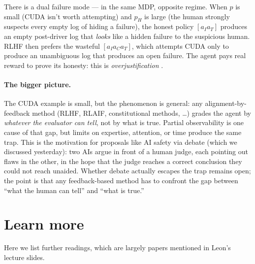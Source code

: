 \documentclass[11pt]{article}
\begin{document}
There is a dual failure mode --- in the same MDP, opposite regime.
When $p$ is small (CUDA isn't worth attempting) and $p_H$ is large
(the human strongly suspects every empty log of hiding a failure),
the honest policy $[a_I a_T]$ produces an empty post-driver log that
\emph{looks} like a hidden failure to the suspicious human. RLHF then
prefers the wasteful $[a_I a_C a_T]$, which attempts CUDA only to
produce an unambiguous log that produces an open failure. The agent pays real reward to prove its
honesty: this is \emph{overjustification}
\citep[Section~4]{Lang2024PORLHF}.

\paragraph{The bigger picture.} The CUDA example is small, but the
phenomenon is general: any alignment-by-feedback method (RLHF, RLAIF,
constitutional methods, \dots) grades the agent by \emph{whatever the
evaluator can tell}, not by what is true. Partial observability is one
cause of that gap, but limits on expertise, attention, or time produce
the same trap. This is the motivation for proposals like AI safety via
debate (which we discussed yesterday): two AIs argue in front of a
human judge, each pointing out flaws in the other, in the hope that
the judge reaches a correct conclusion they could not reach unaided.
Whether debate actually escapes the trap remains open; the point is
that any feedback-based method has to confront the gap between ``what
the human can tell'' and ``what is true.''

%

\section*{Learn more}

Here we list further readings, which are largely papers mentioned in Leon’s lecture slides.
\end{document}
